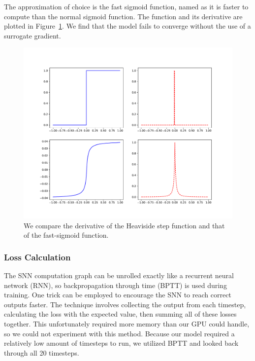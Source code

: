 \documentclass [MS] {UCLAthesis}
\begin{document}

The approximation of choice is the fast sigmoid function, named as it is faster to compute than the normal sigmoid function. The function and its derivative are plotted in Figure~\ref{fig:surrogate_grad}. We find that the model fails to converge without the use of a surrogate gradient.

\begin{figure}
    \centering
    \includegraphics[width=\textwidth]{surrogate_grad}
    \caption[Derivatives of the Heaviside step and fast sigmoid functions]{We compare the derivative of the Heaviside step function and that of the fast-sigmoid function.}
    \label{fig:surrogate_grad}
\end{figure}

\subsubsection{Loss Calculation}

The SNN computation graph can be unrolled exactly like a recurrent neural network (RNN), so backpropagation through time (BPTT) is used during training. One trick can be employed to encourage the SNN to reach correct outputs faster. The technique involves collecting the output from each timestep, calculating the loss with the expected value, then summing all of these losses together. This unfortunately required more memory than our GPU could handle, so we could not experiment with this method. Because our model required a relatively low amount of timesteps to run, we utilized BPTT and looked back through all 20 timesteps.
\end{document}
